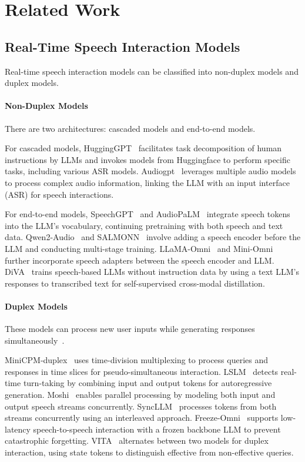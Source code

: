 \section{Related Work}
\label{sec5}
\subsection{Real-Time Speech Interaction Models}
Real-time speech interaction models can be classified into non-duplex models and duplex models.

\paragraph{Non-Duplex Models}
There are two architectures: cascaded models and end-to-end models.

For cascaded models, HuggingGPT~\cite{shen2024hugginggpt} facilitates task decomposition of human instructions by LLMs and invokes models from Huggingface to perform specific tasks, including various ASR models. 
Audiogpt~\cite{huang2024audiogpt} leverages multiple audio models to process complex audio information, linking the LLM with an input interface (ASR) for speech interactions.

For end-to-end models, SpeechGPT~\cite{zhang2023speechgpt} and AudioPaLM~\cite{rubenstein2023audiopalm} integrate speech tokens into the LLM’s vocabulary, continuing pretraining with both speech and text data. 
Qwen2-Audio~\cite{chu2024qwen2} and SALMONN~\cite{tangsalmonn} involve adding a speech encoder before the LLM and conducting multi-stage training. 
LLaMA-Omni~\cite{fang2024llama} and Mini-Omni~\cite{xie2024mini} further incorporate speech adapters between the speech encoder and LLM. 
DiVA~\cite{held2024distilling} trains speech-based LLMs without instruction data by using a text LLM’s responses to transcribed text for self-supervised cross-modal distillation.

\paragraph{Duplex Models}
These models can process new user inputs while generating responses simultaneously~\cite{veluri2024beyond,xu2024enabling}.

MiniCPM-duplex~\cite{zhang2024beyond} uses time-division multiplexing to process queries and responses in time slices for pseudo-simultaneous interaction.
LSLM~\cite{ma2024language} detects real-time turn-taking by combining input and output tokens for autoregressive generation.
Moshi~\cite{defossez2024moshi} enables parallel processing by modeling both input and output speech streams concurrently.
SyncLLM~\cite{veluri2024beyond} processes tokens from both streams concurrently using an interleaved approach.
Freeze-Omni~\cite{wang2024freeze} supports low-latency speech-to-speech interaction with a frozen backbone LLM to prevent catastrophic forgetting.
VITA~\cite{fu2024vita} alternates between two models for duplex interaction, using state tokens to distinguish effective from non-effective queries.

